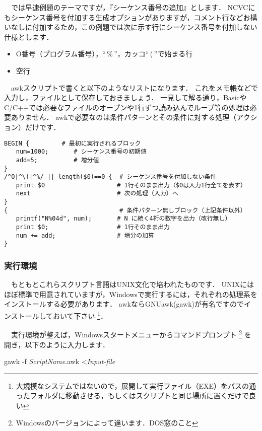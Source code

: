 　では早速例題のテーマですが，『シーケンス番号の追加』とします．
NCVCにもシーケンス番号を付加する生成オプションがありますが，コメント行などお構いなしに付加するため，この例題では次に示す行にシーケンス番号を付加しない仕様とします．

\begin{itemize}
\item O番号（プログラム番号），``\,\%\,''，カッコ``\,(\,''で始まる行
\item 空行
\end{itemize}

　awkスクリプトで書くと以下のようなリストになります．
これをメモ帳などで入力し，ファイルとして保存しておきましょう．
一見して解る通り，BasicやC/C++では必要なファイルのオープンや1行ずつ読み込んでループ等の処理は必要ありません．
awkで必要なのは条件パターンとその条件に対する処理（アクション）だけです．

\newpage
\begin{lstlisting}[caption=num.awk,numbers=none,label=lst:num.awk]
BEGIN {         # 最初に実行されるブロック
　　num=1000;       # シーケンス番号の初期値
　　add=5;          # 増分値
}
/^O|^\(|^%/ || length($0)==0 {  # シーケンス番号を付加しない条件
　　print $0                    # 1行そのまま出力（$0は入力1行全てを表す）
　　next                        # 次の処理（入力）へ
}
{                               # 条件パターン無しブロック（上記条件以外）
　　printf("N%04d", num);       # N に続く4桁の数字を出力（改行無し）
　　print $0;                   # 1行そのまま出力
　　num += add;                 # 増分の加算
}
\end{lstlisting}

\subsubsection{実行環境}
　もともとこれらスクリプト言語はUNIX文化で培われたものです．
UNIXにはほぼ標準で用意されていますが，Windowsで実行するには，それぞれの処理系をインストールする必要があります．
awkならGNUawk(gawk)が有名ですのでインストールしておいて下さい
\footnote{大規模なシステムではないので，展開して実行ファイル（EXE）をパスの通ったフォルダに移動させる，もしくはスクリプトと同じ場所に置くだけで良い}．

　実行環境が整えば，Windowsスタートメニューからコマンドプロンプト
\footnote{Windowsのバージョンによって違います．DOS窓のこと}
を開き，以下のように入力します．

\vspace*{1zh}
\begin{shadebox}
gawk -f \textit{ScriptName}.awk \textless \textit{Input-file}
\end{shadebox}

